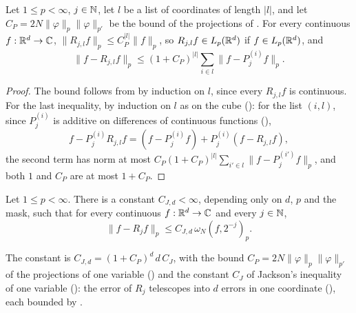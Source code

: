 \begin{lemma}
\label{lem:daub-rd-telescoping}
\leanok
{}
Let $1 \leq p < \infty$, $j \in \mathbb{N}$, let $l$ be a list of coordinates of length $|l|$, and let
$C_P = 2N \|\varphi\|_p \|\varphi\|_{p'}$ be the bound of the projections of
. For every continuous $f : \mathbb{R}^d \to \mathbb{C}$,
$\|R_{j,l} f\|_p \leq C_P^{|l|} \|f\|_p$, so $R_{j,l} f \in L_p(\mathbb{R}^d)$ if $f \in L_p(\mathbb{R}^d)$, and
\[
  \|f - R_{j,l} f\|_p \leq (1 + C_P)^{|l|} \sum_{i \in l} \|f - P^{(i)}_j f\|_p .
\]
\end{lemma}

\begin{proof}
\leanok
{}
The bound follows from  by induction on $l$, since every
$R_{j,l} f$ is continuous. For the last inequality, by induction on $l$ as on the cube
(): for the list $(i, l)$, since $P^{(i)}_j$ is additive on
differences of continuous functions (),
\[
  f - P^{(i)}_j R_{j,l} f = (f - P^{(i)}_j f) + P^{(i)}_j (f - R_{j,l} f) ,
\]
the second term has norm at most $C_P (1 + C_P)^{|l|} \sum_{i' \in l} \|f - P^{(i')}_j f\|_p$,
and both $1$ and $C_P$ are at most $1 + C_P$.
\end{proof}

\begin{proposition}
\label{prop:daub-rd-fold-direct}
\leanok
{}
Let $1 \leq p < \infty$. There is a constant $C_{J,d} < \infty$, depending only on $d$, $p$ and the
mask, such that for every continuous $f : \mathbb{R}^d \to \mathbb{C}$ and every $j \in \mathbb{N}$,
\[
  \|f - R_j f\|_p \leq C_{J,d} \, \omega_N(f, 2^{-j})_p .
\]
\end{proposition}

The constant is $C_{J,d} = (1 + C_P)^d \, d \, C_J$, with the bound
$C_P = 2N \|\varphi\|_p \|\varphi\|_{p'}$ of the projections of one variable
() and the constant $C_J$ of Jackson's inequality of one variable
(): the error of $R_j$ telescopes into $d$ errors in one
coordinate (), each bounded by
.

